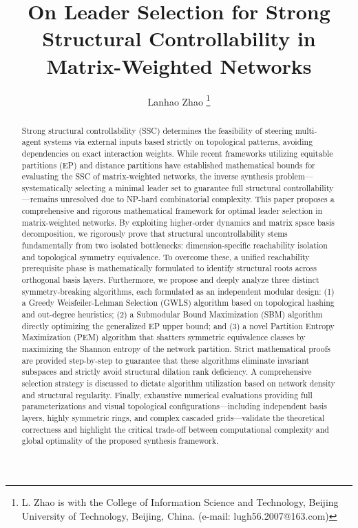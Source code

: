\documentclass{IEEEtran}
\title{\LARGE \bf
	On Leader Selection for Strong Structural Controllability in Matrix-Weighted Networks
}
\author{Lanhao Zhao
	\thanks{L. Zhao is with the College of Information Science and Technology, Beijing University of Technology, Beijing, China. (e-mail: lugh56.2007@163.com)}
}
\begin{document}
	\maketitle
	\thispagestyle{empty}
	\pagestyle{empty}
	
	\begin{abstract}
		Strong structural controllability (SSC) determines the feasibility of steering multi-agent systems via external inputs based strictly on topological patterns, avoiding dependencies on exact interaction weights. While recent frameworks utilizing equitable partitions (EP) and distance partitions have established mathematical bounds for evaluating the SSC of matrix-weighted networks, the inverse synthesis problem—systematically selecting a minimal leader set to guarantee full structural controllability—remains unresolved due to NP-hard combinatorial complexity. This paper proposes a comprehensive and rigorous mathematical framework for optimal leader selection in matrix-weighted networks. By exploiting higher-order dynamics and matrix space basis decomposition, we rigorously prove that structural uncontrollability stems fundamentally from two isolated bottlenecks: dimension-specific reachability isolation and topological symmetry equivalence. To overcome these, a unified reachability prerequisite phase is mathematically formulated to identify structural roots across orthogonal basis layers. Furthermore, we propose and deeply analyze three distinct symmetry-breaking algorithms, each formulated as an independent modular design: (1) a Greedy Weisfeiler-Lehman Selection (GWLS) algorithm based on topological hashing and out-degree heuristics; (2) a Submodular Bound Maximization (SBM) algorithm directly optimizing the generalized EP upper bound; and (3) a novel Partition Entropy Maximization (PEM) algorithm that shatters symmetric equivalence classes by maximizing the Shannon entropy of the network partition. Strict mathematical proofs are provided step-by-step to guarantee that these algorithms eliminate invariant subspaces and strictly avoid structural dilation rank deficiency. A comprehensive selection strategy is discussed to dictate algorithm utilization based on network density and structural regularity. Finally, exhaustive numerical evaluations providing full parameterizations and visual topological configurations—including independent basis layers, highly symmetric rings, and complex cascaded grids—validate the theoretical correctness and highlight the critical trade-off between computational complexity and global optimality of the proposed synthesis framework.
	\end{abstract}
	
\end{document}
